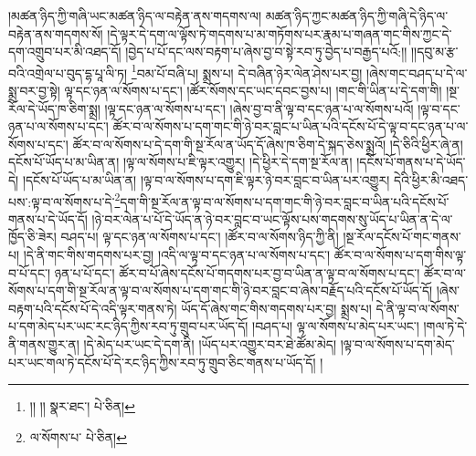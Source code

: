 །མཚན་ཉིད་ཀྱི་གཞི་ཡང་མཚན་ཉིད་ལ་བརྟེན་ནས་གདགས་ལ། མཚན་ཉིད་ཀྱང་མཚན་ཉིད་ཀྱི་གཞི་དེ་ཉིད་ལ་བརྟེན་ནས་གདགས་སོ། །དེ་ལྟར་དེ་དག་ལ་ལྟོས་ཏེ་གདགས་པ་མ་གཏོགས་པར་རྣམ་པ་གཞན་གང་གིས་ཀྱང་དེ་དག་འགྲུབ་པར་མི་འཐད་དོ། །བྱེད་པ་པོ་དང་ལས་བརྟག་པ་ཞེས་བྱ་བ་སྟེ་རབ་ཏུ་བྱེད་པ་བརྒྱད་པའོ:།། །།དབུ་མ་རྩ་བའི་འགྲེལ་པ་བུད་དྷ་པཱ་ལི་ཏ། \footnote{།། །།   སྣར་ཐང་།  པེ་ཅིན། }བམ་པོ་བཞི་པ། སྨྲས་པ། དེ་བཞིན་ཉེར་ལེན་ཤེས་པར་བྱ། །ཞེས་གང་བཤད་པ་དེ་ལ་སྨྲ་བར་བྱ་སྟེ། ལྟ་དང་ཉན་ལ་སོགས་པ་དང་། །ཚོར་སོགས་དང་ཡང་དབང་བྱས་པ། །གང་གི་ཡིན་པ་དེ་དག་གི། །སྔ་རོལ་དེ་ཡོད་ཁ་ཅིག་སྨྲ། །ལྟ་དང་ཉན་ལ་སོགས་པ་དང་། །ཞེས་བྱ་བ་ནི་ལྟ་བ་དང་ཉན་པ་ལ་སོགས་པའོ། །ལྟ་བ་དང་ཉན་པ་ལ་སོགས་པ་དང་། ཚོར་བ་ལ་སོགས་པ་དག་གང་གི་ཉེ་བར་བླང་པ་ཡིན་པའི་དངོས་པོ་དེ་ལྟ་བ་དང་ཉན་པ་ལ་སོགས་པ་དང་། ཚོར་བ་ལ་སོགས་པ་དེ་དག་གི་སྔ་རོལ་ན་ཡོད་དོ་ཞེས་ཁ་ཅིག་དེ་སྐད་ཅེས་སྨྲའོ། །དེ་ཅིའི་ཕྱིར་ཞེ་ན། དངོས་པོ་ཡོད་པ་མ་ཡིན་ན། །ལྟ་ལ་སོགས་པ་ཇི་ལྟར་འགྱུར། །དེ་ཕྱིར་དེ་དག་སྔ་རོལ་ན། །དངོས་པོ་གནས་པ་དེ་ཡོད་དེ། །དངོས་པོ་ཡོད་པ་མ་ཡིན་ན། །ལྟ་བ་ལ་སོགས་པ་དག་ཇི་ལྟར་ཉེ་བར་བླང་བ་ཡིན་པར་འགྱུར། དེའི་ཕྱིར་མི་འཐད་པས་:ལྟ་བ་ལ་སོགས་པ་དེ་\footnote{ལ་སོགས་པ་  པེ་ཅིན། }དག་གི་སྔ་རོལ་ན་ལྟ་བ་ལ་སོགས་པ་དག་གང་གི་ཉེ་བར་བླང་བ་ཡིན་པའི་དངོས་པོ་གནས་པ་དེ་ཡོད་དོ། །ཉེ་བར་ལེན་པ་པོ་དེ་ཡོད་ན་ཉེ་བར་བླང་བ་ཡང་ལྟོས་པས་གདགས་སུ་ཡོད་པ་ཡིན་ན་དེ་ལ་ཁྱོད་ཅི་ཟེར། བཤད་པ། ལྟ་དང་ཉན་ལ་སོགས་པ་དང་། །ཚོར་བ་ལ་སོགས་ཉིད་ཀྱི་ནི། །སྔ་རོལ་དངོས་པོ་གང་གནས་པ། །དེ་ནི་གང་གིས་གདགས་པར་བྱ། །འདི་ལ་ལྟ་བ་དང་ཉན་པ་ལ་སོགས་པ་དང་། ཚོར་བ་ལ་སོགས་པ་དག་གིས་ལྟ་བ་པོ་དང་། ཉན་པ་པོ་དང་། ཚོར་བ་པོ་ཞེས་དངོས་པོ་གདགས་པར་བྱ་བ་ཡིན་ན་ལྟ་བ་ལ་སོགས་པ་དང་། ཚོར་བ་ལ་སོགས་པ་དག་གི་སྔ་རོལ་ན་ལྟ་བ་ལ་སོགས་པ་དག་གང་གི་ཉེ་བར་བླང་བ་ཞེས་བརྗོད་པའི་དངོས་པོ་ཡོད་དོ། །ཞེས་བརྟག་པའི་དངོས་པོ་དེ་འདི་ལྟར་གནས་ཏེ། ཡོད་དོ་ཞེས་གང་གིས་གདགས་པར་བྱ། སྨྲས་པ། དེ་ནི་ལྟ་བ་ལ་སོགས་པ་དག་མེད་པར་ཡང་རང་ཉིད་ཀྱིས་རབ་ཏུ་གྲུབ་པར་ཡོད་དོ། །བཤད་པ། ལྟ་ལ་སོགས་པ་མེད་པར་ཡང་། །གལ་ཏེ་དེ་ནི་གནས་གྱུར་ན། །དེ་མེད་པར་ཡང་དེ་དག་ནི། །ཡོད་པར་འགྱུར་བར་ཐེ་ཚོམ་མེད། །ལྟ་བ་ལ་སོགས་པ་དག་མེད་པར་ཡང་གལ་ཏེ་དངོས་པོ་དེ་རང་ཉིད་ཀྱིས་རབ་ཏུ་གྲུབ་ཅིང་གནས་པ་ཡོད་དོ། །
